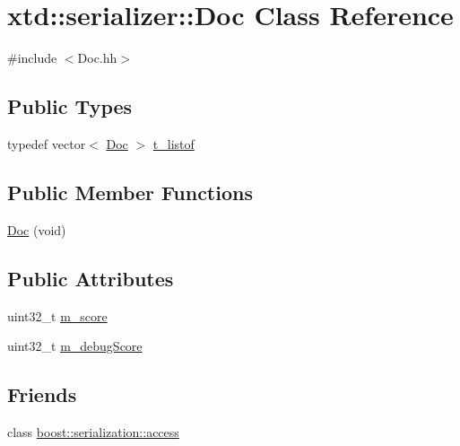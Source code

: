 \hypertarget{classxtd_1_1serializer_1_1Doc}{\section{xtd\-:\-:serializer\-:\-:Doc Class Reference}
\label{classxtd_1_1serializer_1_1Doc}
}


{\ttfamily \#include $<$Doc.\-hh$>$}

\subsection*{Public Types}
\begin{DoxyCompactItemize}
\item 
typedef vector$<$ \hyperlink{classxtd_1_1serializer_1_1Doc}{Doc} $>$ \hyperlink{classxtd_1_1serializer_1_1Doc_a993fd17fc627ae6d1af0aad1a11e9975}{t\-\_\-listof}
\end{DoxyCompactItemize}
\subsection*{Public Member Functions}
\begin{DoxyCompactItemize}
\item 
\hyperlink{classxtd_1_1serializer_1_1Doc_ab1d69c51eaac6754260114a91186061f}{Doc} (void)
\end{DoxyCompactItemize}
\subsection*{Public Attributes}
\begin{DoxyCompactItemize}
\item 
uint32\-\_\-t \hyperlink{classxtd_1_1serializer_1_1Doc_ac6e0a47819dac6373483fb0dd5ad91d0}{m\-\_\-score}
\item 
uint32\-\_\-t \hyperlink{classxtd_1_1serializer_1_1Doc_ae35b707444a257c668b6cc8dfb2d63e4}{m\-\_\-debug\-Score}
\end{DoxyCompactItemize}
\subsection*{Friends}
\begin{DoxyCompactItemize}
\item 
class \hyperlink{classxtd_1_1serializer_1_1Doc_ac98d07dd8f7b70e16ccb9a01abf56b9c}{boost\-::serialization\-::access}
\end{DoxyCompactItemize}


